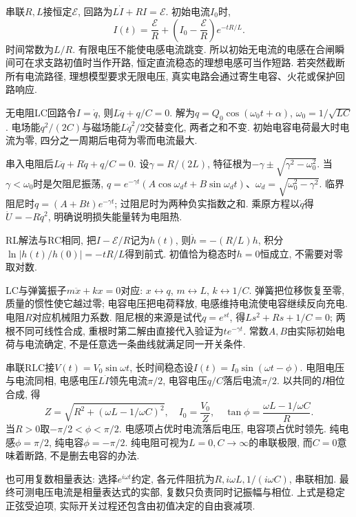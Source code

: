 \label{ch:ac}
串联$R,L$接恒定$\mathcal E$, 回路为$L\dot I+RI=\mathcal E$. 初始电流$I_0$时,
\[
I(t)=\frac{\mathcal E}R+\left(I_0-\frac{\mathcal E}R\right)e^{-tR/L}.
\]
时间常数为$L/R$. 有限电压不能使电感电流跳变. 所以初始无电流的电感在合闸瞬间可在求支路初值时当作开路, 恒定直流稳态的理想电感可当作短路. 若突然截断所有电流路径, 理想模型要求无限电压, 真实电路会通过寄生电容、火花或保护回路响应.

无电阻LC回路令$I=\dot q$, 则$L\ddot q+q/C=0$. 解为$q=Q_0\cos(\omega_0t+\alpha)$, $\omega_0=1/\sqrt{LC}$. 电场能$q^2/(2C)$与磁场能$L\dot q^2/2$交替变化, 两者之和不变. 初始电容电荷最大时电流为零, 四分之一周期后电荷为零而电流最大.

串入电阻后$L\ddot q+R\dot q+q/C=0$. 设$\gamma=R/(2L)$, 特征根为$-\gamma\pm\sqrt{\gamma^2-\omega_0^2}$. 当$\gamma<\omega_0$时是欠阻尼振荡, $q=e^{-\gamma t}(A\cos\omega_dt+B\sin\omega_dt)$、$\omega_d=\sqrt{\omega_0^2-\gamma^2}$. 临界阻尼时$q=(A+Bt)e^{-\gamma t}$; 过阻尼时为两种负实指数之和. 乘原方程以$\dot q$得$\dot U=-R\dot q^2$, 明确说明损失能量转为电阻热.

RL解法与RC相同, 把$I-\mathcal E/R$记为$h(t)$, 则$\dot h=-(R/L)h$, 积分$\ln|h(t)/h(0)|=-tR/L$得到前式. 初值恰为稳态时$h=0$恒成立, 不需要对零取对数.

LC与弹簧振子$m\ddot x+kx=0$对应: $x\leftrightarrow q$, $m\leftrightarrow L$, $k\leftrightarrow1/C$. 弹簧把位移恢复至零, 质量的惯性使它越过零; 电容电压把电荷释放, 电感维持电流使电容继续反向充电. 电阻$R$对应机械阻力系数. 阻尼根的来源是试代$q=e^{st}$, 得$Ls^2+Rs+1/C=0$; 两根不同可线性合成, 重根时第二解由直接代入验证为$te^{-\gamma t}$. 常数$A,B$由实际初始电荷与电流确定, 不是任意选一条曲线就满足同一开关条件.

串联RLC接$V(t)=V_0\sin\omega t$, 长时间稳态设$I(t)=I_0\sin(\omega t-\phi)$. 电阻电压与电流同相, 电感电压$L\dot I$领先电流$\pi/2$, 电容电压$q/C$落后电流$\pi/2$. 以共同的$I$相位合成, 得
\[
Z=\sqrt{R^2+(\omega L-1/\omega C)^2},\quad I_0=\frac{V_0}{Z},\quad
\tan\phi=\frac{\omega L-1/\omega C}{R}.
\]
当$R>0$取$-\pi/2<\phi<\pi/2$. 电感项占优时电流落后电压, 电容项占优时领先. 纯电感$\phi=\pi/2$, 纯电容$\phi=-\pi/2$. 纯电阻可视为$L=0,C\to\infty$的串联极限, 而$C=0$意味着断路, 不是删去电容的办法.

也可用复数相量表达: 选择$e^{i\omega t}$约定, 各元件阻抗为$R,i\omega L,1/(i\omega C)$, 串联相加. 最终可测电压电流是相量表达式的实部, 复数只负责同时记振幅与相位. 上式是稳定正弦受迫项, 实际开关过程还包含由初值决定的自由衰减项.

